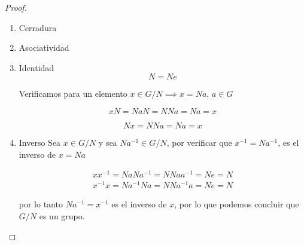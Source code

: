 	\begin{proof}
		\begin{enumerate}[i]
			\item Cerradura

			\item Asociatividad

			\item Identidad
			\begin{equation}
				N = N e
			\end{equation}

			Verificamos para un elemento $x \in G/N \implies x = N a$, $a\in G$

			\begin{equation}
				x N = N a N = N N a = N a = x \nonumber
			\end{equation}

			\begin{equation}
				N x = N N a = N a = x
			\end{equation}
			\item Inverso
			Sea $x \in G/N$ y sea $N a^{-1} \in G/N$, por verificar que $x^{-1} = N a^{-1}$, es el inverso de $x = N a$

			\begin{eqnarray}
				x x^{-1} = N a N a^{-1} = N N a a^{-1} = N e = N \\
				x^{-1} x = N a^{-1} N a = N N a^{-1} a = N e = N
			\end{eqnarray}

			por lo tanto $N a^{-1} = x^{-1}$ es el inverso de $x$, por lo que podemos concluir que $G/N$ es un grupo.

		\end{enumerate}
	\end{proof}
